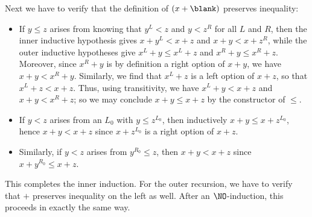 \begin{eg}
Next we have to verify that the definition of $(x+\blank)$ preserves inequality:
\begin{itemize}
\item If $y\le z$ arises from knowing that $y^L<z$ and $y<z^R$ for all $L$ and $R$, then the inner inductive hypothesis gives $x+y^L<x+z$ and $x+y < x+z^R$, while the outer inductive hypotheses give $x^L+y \le x^L+z$ and $x^R+ y \le x^R+z$.
  Moreover, since $x^R+y$ is by definition a right option of $x+y$, we have $x+y < x^R+y$.
  Similarly, we find that $x^L+z$ is a left option of $x+z$, so that $x^L+z < x+z$.
  Thus, using transitivity, we have $x^L+y < x+z$ and $x+y < x^R+z$; so we may conclude $x+y \le x+z$ by the constructor of $\le$.
\item If $y<z$ arises from an $L_0$ with $y\le z^{L_0}$, then inductively $x+y \le x+z^{L_0}$, hence $x+y<x+z$ since $x+z^{L_0}$ is a right option of $x+z$.
\item Similarly, if $y<z$ arises from $y^{R_0}\le z$, then $x+y<x+z$ since $x+y^{R_0}\le x+z$.
\end{itemize}
This completes the inner induction.
For the outer recursion, we have to verify that $+$ preserves inequality on the left as well.
After an $\NO$-induction, this proceeds in exactly the same way.
\end{eg}

